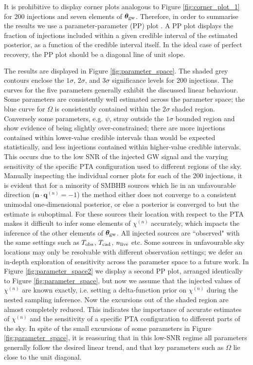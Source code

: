 \documentclass[fleqn,usenatbib,useAMS]{mnras}
\begin{document}
It is prohibitive to display corner plots analogous to Figure \ref{fig:corner_plot_1} for 200 injections and seven elements of $\boldsymbol{\theta}_{\rm gw}$. Therefore, in order to summarise the results we use a parameter-parameter (PP) plot \citep{doi:10.1198/106186006X136976}. A PP plot displays the fraction of injections included within a given credible interval of the estimated posterior, as a function of the credible interval itself. In the ideal case of perfect recovery, the PP plot should be a diagonal line of unit slope. \newline 
 
The results are displayed in Figure \ref{fig:parameter_space}. The shaded grey contours enclose the $1\sigma$, $2\sigma$, and $3\sigma$ significance levels for 200 injections. The curves for the five parameters generally exhibit the discussed linear behaviour. Some parameters are consistently well estimated across the parameter space; the blue curve for $\Omega$ is consistently contained within the 2$\sigma$ shaded region. Conversely some parameters, e.g. $\psi$, stray outside the $1\sigma$ bounded region and show evidence of being slightly over-constrained; there are more injections contained within lower-value credible intervals than would be expected statistically, and less injections contained within higher-value credible intervals. This occurs due to the low SNR of the injected GW signal and the varying sensitivity of the specific PTA configuration used to different regions of the sky. Manually inspecting the individual corner plots for each of the 200 injections, it is evident that for a minority of SMBHB sources which lie in an unfavourable direction ($\boldsymbol{n} \cdot \boldsymbol{q}^{(n)} = -1$) the method either does not converge to a consistent unimodal one-dimensional posterior, or else a posterior is converged to but the estimate is suboptimal. For these sources their location with respect to the PTA makes it difficult to infer some elements of $\chi^{(n)}$ accurately, which impacts the inference of the other elements of $\boldsymbol{\theta}_{\rm gw}$. All injected sources are ``observed" with the same settings such as $T_{\rm obs}$, $T_{\rm cad}$, $n_{\rm live}$ etc. Some sources in unfavourable sky locations  may only be resolvable with different observation settings; we defer an in-depth exploration of sensitivity across the parameter space to a future work. In Figure \ref{fig:parameter_space2} we display a second PP plot, arranged identically to Figure \ref{fig:parameter_space}, but now we assume that the injected values of $\chi^{(n)}$ are known exactly, i.e. setting a delta-function prior on $\chi^{(n)}$ during the nested sampling inference. Now the excursions out of the shaded region are almost completely reduced. This indicates the importance of accurate estimates of $\chi^{(n)}$ and the sensitivity of a specific PTA configuration to different parts of the sky. In spite of the small excursions of some parameters in Figure \ref{fig:parameter_space}, it is reassuring that in this low-SNR regime all parameters generally follow the desired linear trend, and that key parameters such as $\Omega$ lie close to the unit diagonal. 
\end{document}

